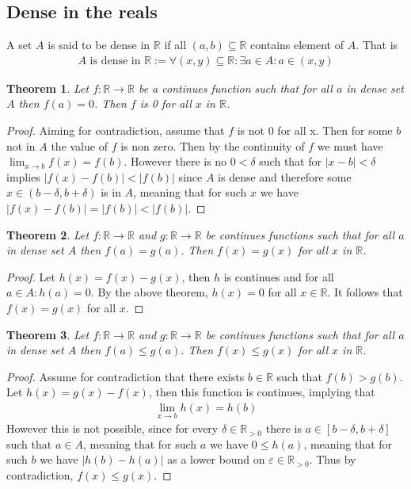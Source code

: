 \documentclass{article}
\newtheorem{theorem}{Theorem}[section]
\begin{document}
\subsection{Dense in the reals}
A set $A$ is said to be dense in $\mathbb{R}$ if all $(a,b) \subseteq
\mathbb{R}$ contains element of $A$. That is 
\begin{align*}
	A \text{ is dense in } \mathbb{R} := \forall (x,y) \subseteq \mathbb{R}:
	\exists a \in A: a \in (x,y)
\end{align*}
\begin{theorem}
	Let $f: \mathbb{R} \rightarrow \mathbb{R}$ be a continues function such that
	for all $a$ in dense set $A$ then $f(a)=0$. Then $f$ is 0 for all $x$ in
	$\mathbb{R}$.
\end{theorem}
\begin{proof}
	Aiming for contradiction, assume that $f$ is not 0 for all x. Then for some
	$b$ not in $A$ the value of $f$ is non zero. Then by the continuity of $f$ 
	we must have $\lim_{x \rightarrow b} f(x) = f(b)$. However there is no $0 <
	\delta$ such that for $|x-b| < \delta$ implies $|f(x)-f(b)|<|f(b)|$ since
	$A$ is dense and therefore some $x \in (b-\delta,b+\delta)$ is in $A$,
	meaning that for such $x$ we have $|f(x)-f(b)| = |f(b)| < |f(b)|$.
\end{proof}
\begin{theorem}
	Let $f: \mathbb{R} \rightarrow \mathbb{R}$ and $g: \mathbb{R} \rightarrow 
	\mathbb{R}$ be continues functions such that
	for all $a$ in dense set $A$ then $f(a)=g(a)$. Then $f(x)=g(x)$ for all $x$ 
	in $\mathbb{R}$.
\end{theorem}
\begin{proof}
	Let $h(x) = f(x)-g(x)$, then $h$ is continues and for all $a \in A: h(a) 
	= 0$. By the above theorem, $h(x)=0$ for all $x \in \mathbb{R}$. It follows
	that $f(x)=g(x)$ for all $x$.
\end{proof}
\begin{theorem}
	Let $f: \mathbb{R} \rightarrow \mathbb{R}$ and $g: \mathbb{R} \rightarrow 
	\mathbb{R}$ be continues functions such that
	for all $a$ in dense set $A$ then $f(a) \leq g(a)$. Then $f(x) \leq g(x)$ 
	for all $x$ in $\mathbb{R}$.
\end{theorem}
\begin{proof}
	Assume for contradiction that there exists $b \in \mathbb{R}$ such that
	$f(b)>g(b)$. Let $h(x)=g(x)-f(x)$, then this function is continues, implying
	that
	\begin{align}
		\lim_{x \rightarrow b} h(x) = h(b)
	\end{align}
	However this is not possible, since for every $\delta \in
	\mathbb{R}_{>0}$ there is $a \in [b-\delta,b+\delta]$ such that $a \in A$,
	meaning that for such $a$ we have $0 \leq h(a)$, meaning that for such $b$
	we have $|h(b)-h(a)|$ as a lower bound on $\varepsilon \in \mathbb{R}_{>0}$.
	Thus by contradiction, $f(x) \leq g(x)$.
\end{proof}
\end{document}
